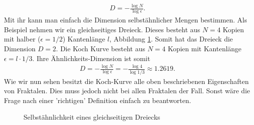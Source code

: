 \begin{align*}
	D = - \frac{\log N}{\log \epsilon }.
\end{align*}
Mit ihr kann man einfach die Dimension selbstähnlicher Mengen bestimmen.
Als Beispiel nehmen wir ein gleichseitiges Dreieck. Dieses besteht aus $N = 4$ Kopien mit halber ($\epsilon = 1/2$) Kantenlänge $l$, Abbildung \ref{ifs:trinagle}.
Somit hat das Dreieck die Dimension $D = 2$.
Die Koch Kurve besteht aus $N = 4$ Kopien mit Kantenlänge $\epsilon =l \cdot 1/3$.
Ihre  Ähnlichkeits-Dimension ist somit
\begin{align*}
	D = - \frac{\log N }{\log \epsilon } = - \frac{\log 4 }{\log 1/3 } \approx 1.2619.
\end{align*}
Wie wir nun sehen besitzt die Koch-Kurve alle oben beschriebenen Eigenschaften von Fraktalen. 
Dies muss jedoch nicht bei allen Fraktalen der Fall. Sonst wäre die Frage nach einer 'richtigen' Definition einfach zu beantworten.
\begin{figure}
	\centering
	\caption{Selbstähnlichkeit eines gleichseitigen Dreiecks}
	\label{ifs:trinagle}
\end{figure}

